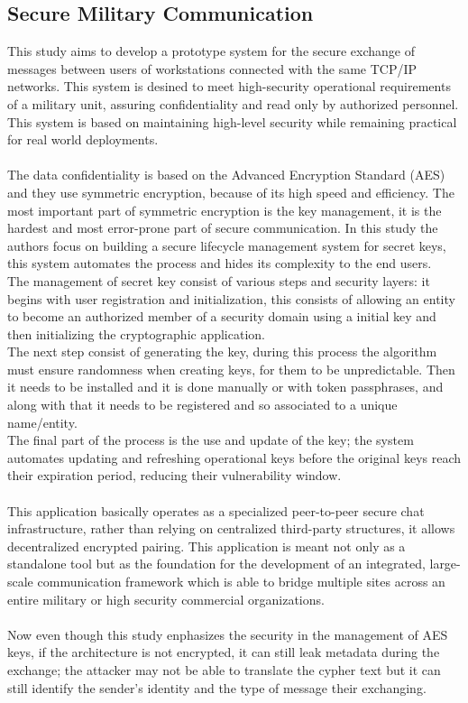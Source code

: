 \subsection{Secure Military Communication}
This study \cite{bardis2008design} aims to develop a prototype system for the secure exchange of messages between users of workstations connected with the same TCP/IP networks. This system is desined to meet high-security operational requirements of a military unit, assuring confidentiality and read only by authorized personnel.
This system is based on maintaining high-level security while remaining practical for real world deployments. 
\\\\The data confidentiality is based on the Advanced Encryption Standard (AES) and they use symmetric encryption, because of its high speed and efficiency. 
The most important part of symmetric encryption is the key management, it is the hardest and most error-prone part of secure communication. In this study the authors focus on building a secure lifecycle management system for secret keys, this system automates the process and hides its complexity to the end users.
\\The management of secret key consist of various steps and security layers: it begins with user registration and initialization, this consists of allowing an entity to become an authorized member of a security domain using a initial key and then initializing the cryptographic application.
\\The next step consist of generating the key, during this process the algorithm must ensure randomness when creating keys, for them to be unpredictable. Then it needs to be installed and it is done manually or with token passphrases, and along with that it needs to be registered and so associated to a unique name/entity.
\\The final part of the process is the use and update of the key; the system automates updating and refreshing operational keys before the original keys reach their expiration period, reducing their vulnerability window.
\\\\This application basically operates as a specialized peer-to-peer secure chat infrastructure, rather than relying on centralized third-party structures, it allows decentralized encrypted pairing. 
This application is meant not only as a standalone tool but as the foundation for the development of an integrated, large-scale communication framework which is able to bridge multiple sites across an entire military or high security commercial organizations.
\\\\Now even though this study enphasizes the security in the management of AES keys, if the architecture is not encrypted, it can still leak metadata during the exchange; the attacker may not be able to translate the cypher text but it can still identify the sender's identity and the type of message their exchanging.